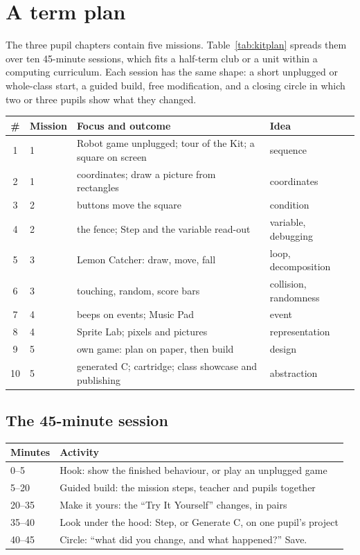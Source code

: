 \section{A term plan}

The three pupil chapters contain five missions. Table~\ref{tab:kitplan}
spreads them over ten 45-minute sessions, which fits a half-term club or a
unit within a computing curriculum. Each session has the same shape: a short
unplugged or whole-class start, a guided build, free modification, and a
closing circle in which two or three pupils show what they changed.

\begin{center}
\begin{tabularx}{\linewidth}{@{}clXl@{}}
\toprule
\# & Mission & Focus and outcome & Idea \\
\midrule
1 & 1 & Robot game unplugged; tour of the Kit; a square on screen & sequence \\
2 & 1 & coordinates; draw a picture from rectangles & coordinates \\
3 & 2 & buttons move the square & condition \\
4 & 2 & the fence; Step and the variable read-out & variable, debugging \\
5 & 3 & Lemon Catcher: draw, move, fall & loop, decomposition \\
6 & 3 & touching, random, score bars & collision, randomness \\
7 & 4 & beeps on events; Music Pad & event \\
8 & 4 & Sprite Lab; pixels and pictures & representation \\
9 & 5 & own game: plan on paper, then build & design \\
10 & 5 & generated C; cartridge; class showcase and publishing & abstraction \\
\bottomrule
\end{tabularx}
\label{tab:kitplan}
\end{center}

\subsection*{The 45-minute session}

\begin{center}
\begin{tabularx}{\linewidth}{@{}lX@{}}
\toprule
Minutes & Activity \\
\midrule
0--5 & Hook: show the finished behaviour, or play an unplugged game \\
5--20 & Guided build: the mission steps, teacher and pupils together \\
20--35 & Make it yours: the ``Try It Yourself'' changes, in pairs \\
35--40 & Look under the hood: Step, or Generate C, on one pupil's project \\
40--45 & Circle: ``what did you change, and what happened?'' Save. \\
\bottomrule
\end{tabularx}
\end{center}

